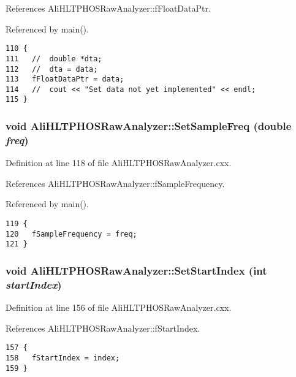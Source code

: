 References Ali\-HLTPHOSRaw\-Analyzer::f\-Float\-Data\-Ptr.

Referenced by main().

\footnotesize\begin{verbatim}110 {
111   //  double *dta;
112   //  dta = data;
113   fFloatDataPtr = data;
114   //  cout << "Set data not yet implemented" << endl;
115 }
\end{verbatim}\normalsize 


\subsubsection{\setlength{\rightskip}{0pt plus 5cm}void Ali\-HLTPHOSRaw\-Analyzer::Set\-Sample\-Freq (double {\em freq})\hspace{0.3cm}{\tt  [inherited]}}\label{classAliHLTPHOSRawAnalyzer_AliHLTPHOSRawAnalyzerPeakFindera13}




Definition at line 118 of file Ali\-HLTPHOSRaw\-Analyzer.cxx.

References Ali\-HLTPHOSRaw\-Analyzer::f\-Sample\-Frequency.

Referenced by main().

\footnotesize\begin{verbatim}119 {
120   fSampleFrequency = freq;
121 }
\end{verbatim}\normalsize 


\subsubsection{\setlength{\rightskip}{0pt plus 5cm}void Ali\-HLTPHOSRaw\-Analyzer::Set\-Start\-Index (int {\em start\-Index})\hspace{0.3cm}{\tt  [inherited]}}\label{classAliHLTPHOSRawAnalyzer_AliHLTPHOSRawAnalyzerPeakFindera14}




Definition at line 156 of file Ali\-HLTPHOSRaw\-Analyzer.cxx.

References Ali\-HLTPHOSRaw\-Analyzer::f\-Start\-Index.

\footnotesize\begin{verbatim}157 {
158   fStartIndex = index;
159 }
\end{verbatim}\normalsize 


